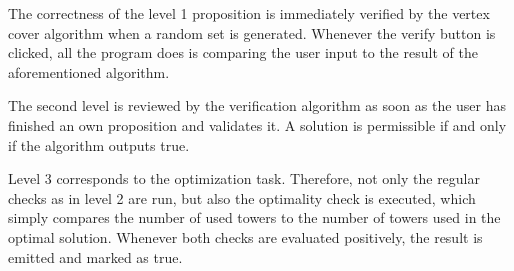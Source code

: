 The correctness of the level 1 proposition is immediately verified by the vertex cover algorithm when a random set is generated. Whenever the verify button is clicked, all the program does is comparing the user input to the result of the aforementioned algorithm.

The second level is reviewed by the verification algorithm as soon as the user has finished an own proposition and validates it. A solution is permissible if and only if the algorithm outputs true. 

Level 3 corresponds to the optimization task. Therefore, not only the regular checks as in level 2 are run, but also the optimality check is executed, which simply compares the number of used towers to the number of towers used in the optimal solution. Whenever both checks are evaluated positively, the result is emitted and marked as true.